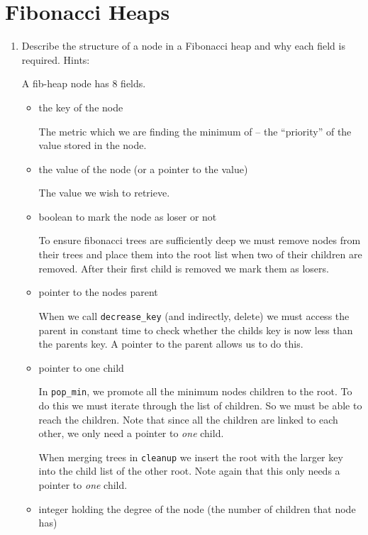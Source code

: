 \documentclass[10pt,\jkfside,a4paper]{article}
\begin{document}
\section{Fibonacci Heaps}

\begin{enumerate}

\item Describe the structure of a node in a Fibonacci heap and why each field is required.
Hints:

A fib-heap node has 8 fields.

\begin{itemize}

\item the key of the node

The metric which we are finding the minimum of -- the ``priority'' of the value stored in 
the node.

\item the value of the node (or a pointer to the value)

The value we wish to retrieve.

\item boolean to mark the node as loser or not

To ensure fibonacci trees are sufficiently deep we must remove nodes from their trees and 
place them into the root list when two of their children are removed. After their first 
child is removed we mark them as losers.

\item pointer to the nodes parent

When we call {\tt decrease\_key} (and indirectly, delete) we must access the parent in constant 
time to check whether the childs key is now less than the parents key. A pointer to the 
parent allows us to do this.

\item pointer to one child

In {\tt pop\_min}, we promote all the minimum nodes children to the root. To do this we must 
iterate through the list of children. So we must be able to reach the children. Note that 
since all the children are linked to each other, we only need a pointer to \textit{one} child. 

When merging trees in {\tt cleanup} we insert the root with the 
larger key into the child list of the other root. Note again that this only needs a pointer 
to \textit{one} child.

\item integer holding the degree of the node (the number of children that node has)


\end{itemize}
\end{enumerate}
\end{document}
